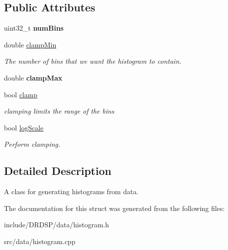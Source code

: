 \subsection*{Public Attributes}
\begin{DoxyCompactItemize}
\item 
\hypertarget{struct_d_r_d_s_p_1_1_histogram_generator_a2f6b01668e743ce436f54c3ca56275a1}{uint32\-\_\-t {\bfseries num\-Bins}}\label{struct_d_r_d_s_p_1_1_histogram_generator_a2f6b01668e743ce436f54c3ca56275a1}

\item 
\hypertarget{struct_d_r_d_s_p_1_1_histogram_generator_aef85198c4644dbcfa27d24e9015bb025}{double \hyperlink{struct_d_r_d_s_p_1_1_histogram_generator_aef85198c4644dbcfa27d24e9015bb025}{clamp\-Min}}\label{struct_d_r_d_s_p_1_1_histogram_generator_aef85198c4644dbcfa27d24e9015bb025}

\begin{DoxyCompactList}\small\item\em The number of bins that we want the histogram to contain. \end{DoxyCompactList}\item 
\hypertarget{struct_d_r_d_s_p_1_1_histogram_generator_a5cec8e7e75d95a66b4a17c3f70c2b556}{double {\bfseries clamp\-Max}}\label{struct_d_r_d_s_p_1_1_histogram_generator_a5cec8e7e75d95a66b4a17c3f70c2b556}

\item 
\hypertarget{struct_d_r_d_s_p_1_1_histogram_generator_a12fe0ce6860a6f8bd17b1355f91c0ac6}{bool \hyperlink{struct_d_r_d_s_p_1_1_histogram_generator_a12fe0ce6860a6f8bd17b1355f91c0ac6}{clamp}}\label{struct_d_r_d_s_p_1_1_histogram_generator_a12fe0ce6860a6f8bd17b1355f91c0ac6}

\begin{DoxyCompactList}\small\item\em clamping limits the range of the bins \end{DoxyCompactList}\item 
\hypertarget{struct_d_r_d_s_p_1_1_histogram_generator_a84935b50902a985afdeca6541bac8c06}{bool \hyperlink{struct_d_r_d_s_p_1_1_histogram_generator_a84935b50902a985afdeca6541bac8c06}{log\-Scale}}\label{struct_d_r_d_s_p_1_1_histogram_generator_a84935b50902a985afdeca6541bac8c06}

\begin{DoxyCompactList}\small\item\em Perform clamping. \end{DoxyCompactList}\end{DoxyCompactItemize}


\subsection{Detailed Description}
A class for generating histograms from data. 

The documentation for this struct was generated from the following files\-:\begin{DoxyCompactItemize}
\item 
include/\-D\-R\-D\-S\-P/data/histogram.\-h\item 
src/data/histogram.\-cpp\end{DoxyCompactItemize}
